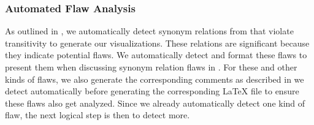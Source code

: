 
\subsubsection{Automated Flaw Analysis}\label{auto-flaw-analysis}

As outlined in , we automatically detect synonym relations
from \ourApproachGlossary{} that violate transitivity to generate our
visualizations. These relations are significant because they indicate potential
flaws. We automatically detect and format these flaws to present them when
discussing synonym relation flaws in . %
For these and other kinds of flaws, we also generate the corresponding comments
as described in  we detect automatically before generating
the corresponding \LaTeX{} file to ensure these flaws also get analyzed.
Since we already automatically detect one kind of flaw, the next logical step
is then to detect more.

